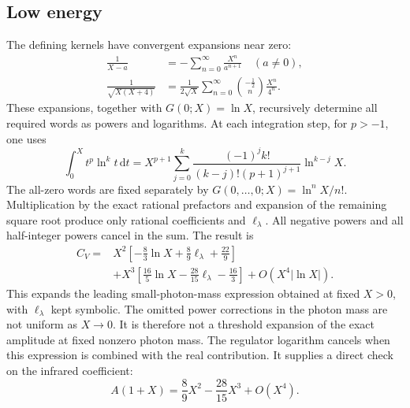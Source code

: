 \subsection{Low energy}
The defining kernels have convergent expansions near zero:
\begin{align}
 \frac{1}{X-a}&=-\sum_{n=0}^\infty\frac{X^n}{a^{n+1}}
 \quad(a\ne0),\\
 \frac{1}{\sqrt{X(X+4)}}
 &=\frac{1}{2\sqrt X}\sum_{n=0}^\infty
   \binom{-\tfrac12}{n}\frac{X^n}{4^n}.
\end{align}
These expansions, together with $G(0;X)=\ln X$, recursively determine
all required words as powers and logarithms.  At each integration step,
for $p>-1$, one uses
\begin{equation}
 \int_0^X t^p\ln^k t\,\mathrm{d}t
 =X^{p+1}\sum_{j=0}^k
 \frac{(-1)^j k!}{(k-j)!(p+1)^{j+1}}\ln^{k-j}X.
\end{equation}
The all-zero words are fixed separately by
$G(0,\ldots,0;X)=\ln^nX/n!$.
Multiplication by the exact rational prefactors and expansion of the
remaining square root produce only rational coefficients and
$\ell_\lambda$.  All negative powers and all half-integer powers cancel
in the sum.  The result is
\begin{align}
 C_V={}&X^2\left[-\frac83\ln X+\frac89\ell_\lambda+\frac{22}{9}\right]
 \\
 &+X^3\left[\frac{16}{5}\ln X-\frac{28}{15}\ell_\lambda-\frac{16}{3}\right]
 +O\!\left(X^4|\ln X|\right).
 \label{eq:compton-independent-virtual-low}
\end{align}
This expands the leading small-photon-mass expression obtained at
fixed $X>0$, with $\ell_\lambda$ kept symbolic. The omitted
power corrections in the photon mass are not uniform as $X\to0$.
It is therefore not a threshold expansion of the exact amplitude at
fixed nonzero photon mass. The regulator logarithm cancels when
this expression is combined with the real contribution.
It supplies a direct check on the infrared coefficient:
\begin{equation}
 A(1+X)=\frac89X^2-\frac{28}{15}X^3+O(X^4).
\end{equation}

